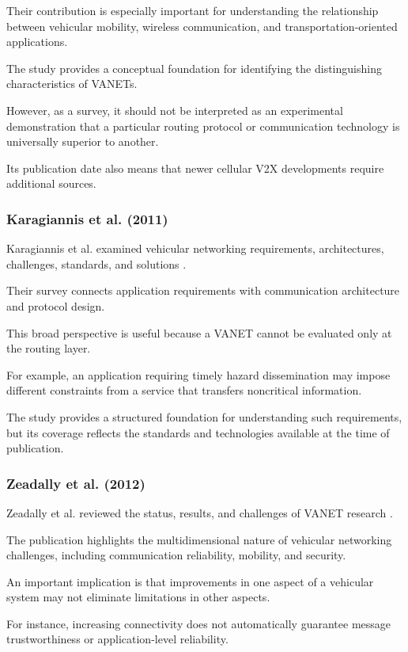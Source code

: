 Their contribution is especially important
for understanding the relationship between
vehicular mobility, wireless communication,
and transportation-oriented applications.

The study provides a conceptual foundation
for identifying the distinguishing
characteristics of VANETs.

However, as a survey, it should not be
interpreted as an experimental demonstration
that a particular routing protocol or
communication technology is universally
superior to another.

Its publication date also means that
newer cellular V2X developments require
additional sources.

\subsubsection{Karagiannis et al. (2011)}

Karagiannis et al. examined vehicular
networking requirements, architectures,
challenges, standards, and solutions
\cite{Karagiannis2011}.

Their survey connects application
requirements with communication
architecture and protocol design.

This broad perspective is useful
because a VANET cannot be evaluated
only at the routing layer.

For example, an application requiring
timely hazard dissemination may impose
different constraints from a service
that transfers noncritical information.

The study provides a structured
foundation for understanding such
requirements, but its coverage
reflects the standards and
technologies available at the
time of publication.

\subsubsection{Zeadally et al. (2012)}

Zeadally et al. reviewed the status,
results, and challenges of VANET
research \cite{Zeadally2012}.

The publication highlights the
multidimensional nature of vehicular
networking challenges, including
communication reliability, mobility,
and security.

An important implication is that
improvements in one aspect of a
vehicular system may not eliminate
limitations in other aspects.

For instance, increasing connectivity
does not automatically guarantee
message trustworthiness or
application-level reliability.


